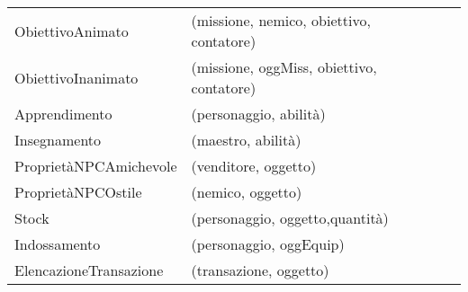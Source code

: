 \begin{table}[H]
{\begin{tabular}{|l|l|l}
ObiettivoAnimato            & (missione, nemico,  obiettivo, contatore)                                                                                                                                                                                     &           \\ \cline{1-2}
ObiettivoInanimato          & (missione, oggMiss, obiettivo, contatore)                                                                                                                                                                                     &           \\ \cline{1-2}
Apprendimento               & (personaggio, abilità)                                                                                                                                                                                                        &           \\ \cline{1-2}
Insegnamento                & (maestro, abilità)                                                                                                                                                                                                            &           \\ \cline{1-2}
ProprietàNPCAmichevole      & (venditore, oggetto)                                                                                                                                                                                                          &           \\ \cline{1-2}
ProprietàNPCOstile          & (nemico, oggetto)                                                                                                                                                                                                             &           \\ \cline{1-2}
Stock                       & (personaggio, oggetto,quantità)                                                                                                                                                                                               &           \\ \cline{1-2}
Indossamento                & (personaggio, oggEquip)                                                                                                                                                                                                       &           \\ \cline{1-2}
ElencazioneTransazione      & (transazione, oggetto)                                                                                                                                                                                                        &           \\ \cline{1-2}
\end{tabular}
}
\end{table}


